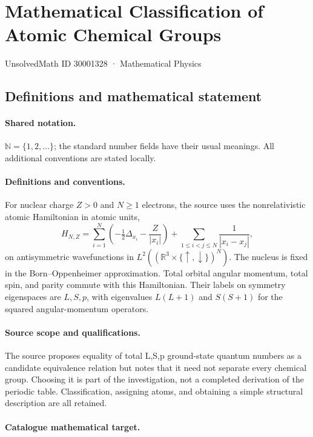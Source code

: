 \documentclass[11pt]{article}
\begin{document}
\setcounter{section}{30001327}
\section{Mathematical Classification of Atomic Chemical Groups}\label{30001328}
{\small UnsolvedMath ID 30001328 · Mathematical Physics}
\subsection{Definitions and mathematical statement}

\paragraph{Shared notation.}$\mathbb N=\{1,2,\ldots\}$; the standard number fields have their usual meanings. All additional conventions are stated locally.


\paragraph{Definitions and conventions.} For nuclear charge $Z>0$ and $N\ge1$ electrons, the source uses the nonrelativistic atomic Hamiltonian in atomic units,
\[
H_{N,Z}=\sum_{i=1}^N\left(-\tfrac12\Delta_{x_i}-\frac{Z}{|x_i|}\right)+
\sum_{1\le i<j\le N}\frac1{|x_i-x_j|},
\]
on antisymmetric wavefunctions in $L^2((\mathbb R^3\times\{\uparrow,\downarrow\})^N)$. The nucleus is fixed in the Born--Oppenheimer approximation. Total orbital angular momentum, total spin, and parity commute with this Hamiltonian. Their labels on symmetry eigenspaces are $L,S,p$, with eigenvalues $L(L+1)$ and $S(S+1)$ for the squared angular-momentum operators.

\paragraph{Source scope and qualifications.} The source proposes equality of total L,S,p ground-state quantum numbers as a candidate equivalence relation but notes that it need not separate every chemical group. Choosing it is part of the investigation, not a completed derivation of the periodic table. Classification, assigning atoms, and obtaining a simple structural description are all retained.

\paragraph{Catalogue mathematical target.}
\end{document}
